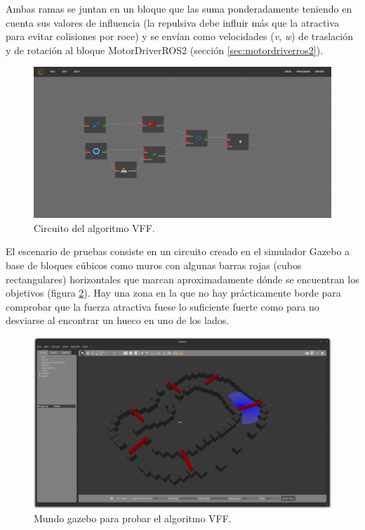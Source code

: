 Ambas ramas se juntan en un bloque que las suma ponderadamente teniendo en cuenta sus valores de influencia (la repulsiva debe influir más que la
atractiva para evitar colisiones por roce) y se envían como velocidades (\textit{v}, \textit{w}) de traslación y de rotación al bloque
MotorDriverROS2 (sección \ref{sec:motordriverros2}).\\

\begin{figure} [H]
    \begin{center}
        \includegraphics[width=12cm]{figs/c6/VFF_circ.png}
    \end{center}
    \caption[Circuito VFF]{Circuito del algoritmo VFF.}
    \label{fig:VFF_circ}
\end{figure}
El escenario de pruebas consiste en un circuito creado en el simulador Gazebo a base de bloques cúbicos como muros con algunas barras
rojas (cubos rectangulares) horizontales que marcan aproximadamente dónde se encuentran los objetivos (figura \ref{fig:VFF_world}). Hay una
zona en la que no hay prácticamente borde para comprobar que la fuerza atractiva fuese lo suficiente fuerte como para no desviarse al encontrar
un hueco en uno de los lados.

\begin{figure} [H]
    \begin{center}
        \includegraphics[width=12cm]{figs/c6/VFF_world.png}
    \end{center}
    \caption[Mundo para VFF]{Mundo gazebo para probar el algoritmo VFF.}
    \label{fig:VFF_world}
\end{figure}


